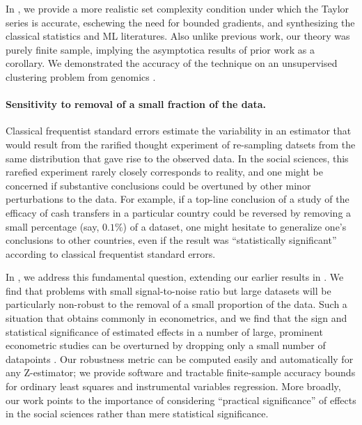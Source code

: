 In \citet{giordano:2019:ij}, we provide a more realistic set complexity
condition under which the Taylor series is accurate, eschewing the need for
bounded gradients, and synthesizing the classical statistics and ML literatures.
Also unlike previous work, our theory was purely finite sample, implying the
asymptotica results of prior work as a corollary.  We demonstrated the accuracy
of the technique on an unsupervised clustering problem from genomics
\citep{shoemaker:2015:ultrasensitive}.


\paragraph{Sensitivity to removal of a small fraction of the data.} Classical
frequentist standard errors estimate the variability in an estimator that would
result from the rarified thought experiment of re-sampling datsets from the same
distribution that gave rise to the observed data.  In the social sciences, this
rarefied experiment rarely closely corresponds to reality, and one might be
concerned if substantive conclusions could be overtuned by other minor
perturbations to the data.  For example, if a top-line conclusion of a study of
the efficacy of cash transfers in a particular country
\citep{angelucci:2009:indirect} could be reversed by removing a small percentage
(say, $0.1\%$) of a dataset, one might hesitate to generalize one's conclusions
to other countries, even if the result was ``statistically significant''
according to classical frequentist standard errors.

In \citet{giordano:2020:amip}, we address this fundamental question, extending
our earlier results in \citet{giordano:2019:ij}.  We find that problems with
small signal-to-noise ratio but large datasets will be particularly non-robust
to the removal of a small proportion of the data. Such a situation that obtains
commonly in econometrics, and we find that the sign and statistical significance
of estimated effects in a number of large, prominent econometric studies can be
overturned by dropping only a small number of datapoints
\citep{angelucci:2009:indirect, finkelstein:2012:oregon}.  Our robustness metric
can be computed easily and automatically for any Z-estimator; we provide
software and tractable finite-sample accuracy bounds for ordinary least squares
and instrumental variables regression.  More broadly, our work points to the
importance of considering ``practical significance'' of effects in the social
sciences rather than mere statistical significance.


